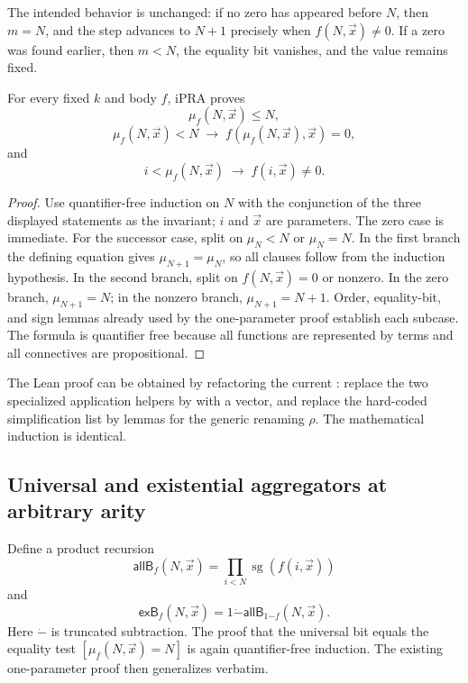 The intended behavior is unchanged: if no zero has appeared before \(N\), then \(m=N\), and the
step advances to \(N+1\) precisely when \(f(N,\vec x)\ne0\).  If a zero was found earlier, then
\(m<N\), the equality bit vanishes, and the value remains fixed.

\begin{theorem}\label{thm:searchk}
For every fixed \(k\) and body \(f\), iPRA proves
\[
 \mu_f(N,\vec x)\le N,
\]
\[
 \mu_f(N,\vec x)<N\;\to\; f(\mu_f(N,\vec x),\vec x)=0,
\]
and
\[
 i<\mu_f(N,\vec x)\;\to\;f(i,\vec x)\ne0.
\]
\end{theorem}

\begin{proof}
Use quantifier-free induction on \(N\) with the conjunction of the three displayed statements as the
invariant; \(i\) and \(\vec x\) are parameters.  The zero case is immediate.  For the successor
case, split on \(\mu_N<N\) or \(\mu_N=N\).  In the first branch the defining equation gives
\(\mu_{N+1}=\mu_N\), so all clauses follow from the induction hypothesis.  In the second branch,
split on \(f(N,\vec x)=0\) or nonzero.  In the zero branch, \(\mu_{N+1}=N\); in the nonzero branch,
\(\mu_{N+1}=N+1\).  Order, equality-bit, and sign lemmas already used by the one-parameter proof
establish each subcase.  The formula is quantifier free because all functions are represented by
terms and all connectives are propositional.
\end{proof}

The Lean proof can be obtained by refactoring the current : replace the two
specialized application helpers by  with a  vector, and replace the
hard-coded simplification list by lemmas for the generic renaming \(\rho\).  The mathematical
induction is identical.

\subsection{Universal and existential aggregators at arbitrary arity}

Define a product recursion
\[
 \mathsf{allB}_f(N,\vec x)=\prod_{i<N}\operatorname{sg}(f(i,\vec x))
\]
and
\[
 \mathsf{exB}_f(N,\vec x)=1\mathbin{\dot-}
   \mathsf{allB}_{1\mathbin{\dot-}f}(N,\vec x).
\]
Here \(\dot-\) is truncated subtraction.  The proof that the universal bit equals the equality test
\([\mu_f(N,\vec x)=N]\) is again quantifier-free induction.  The existing one-parameter proof then
generalizes verbatim.

